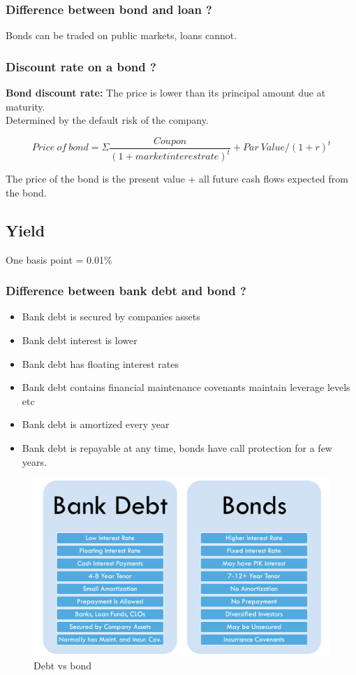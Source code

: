 \documentclass[11pt]{scrartcl} %
\begin{document}
\subsubsection{Difference between bond and loan ?}

Bonds can be traded on public markets, loans cannot.

\subsubsection{Discount rate on a bond ?}

\textbf{Bond discount rate:} The price is lower than its principal amount due at maturity.\\

Determined by the default risk of the company. 

\[ Price\:of\:bond = \Sigma \frac{Coupon}{(1+market interest rate)^t} + Par\:Value/(1+r)^t \]

The price of the bond is the present value + all future cash flows expected from the bond.

\subsection{Yield}

One basis point = 0.01\% 

\subsubsection{Difference between bank debt and bond ?}

\begin{itemize}
	\item Bank debt is secured by companies assets
	\item Bank debt interest is lower
	\item Bank debt has floating interest rates
	\item Bank debt contains financial maintenance covenants maintain leverage levels etc
	\item Bank debt is amortized every year
	\item Bank debt is repayable at any time, bonds have call protection for a few years.
\end{itemize}

\begin{figure}[h] %
	\centering
	\includegraphics[width=0.5\columnwidth]{bank debt vs bond.png} %
	\caption{Debt vs bond}
\end{figure}
\end{document}
